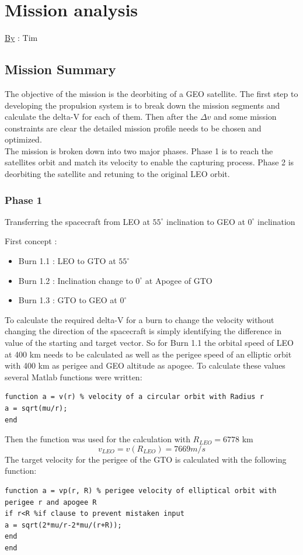 \chapter{Mission analysis}
\qquad \underline{By} : Tim
\section{Mission Summary}
The objective of the mission is the deorbiting of a GEO satellite. The first step to developing the
propulsion system is to break down the mission segments and calculate the delta-V for each of them.
Then after the $\Delta v$ and some mission constraints are clear the detailed mission profile needs to be chosen and optimized.\\

The mission is broken down into two major phases. Phase 1 is to reach the satellites orbit and match its
velocity to enable the capturing process. Phase 2 is deorbiting the satellite and retuning to the original LEO orbit.
\subsection{Phase 1}
\begin{center}
	Transferring the spacecraft from LEO at $55^\circ$ inclination to GEO at $0^\circ$ inclination
\end{center}
First concept : \\

\begin{itemize}
	\item Burn 1.1 : LEO to GTO at $55^\circ$
	\item Burn 1.2 : Inclination change to $0^\circ$ at Apogee of GTO
	\item Burn 1.3 : GTO to GEO at $0^\circ$
\end{itemize}
To calculate the required delta-V for a burn to change the velocity without changing the direction of the spacecraft is simply identifying the difference in value of the starting and target vector. So for Burn 1.1 the orbital speed of LEO at 400 km needs to be calculated as well as the perigee speed of an elliptic orbit with 400 km as perigee and GEO altitude as apogee. To calculate these values several Matlab functions were written:

\begin{verbatim}
function a = v(r) % velocity of a circular orbit with Radius r
a = sqrt(mu/r);
end
\end{verbatim}
Then the function was used for the calculation with $R_{LEO} = 6778$ km
\begin{equation}
	v_{LEO} = v(R_{LEO}) = 7669 m/s
\end{equation}
The target velocity for the perigee of the GTO is calculated with the following function:
\begin{verbatim}
function a = vp(r, R) % perigee velocity of elliptical orbit with perigee r and apogee R
if r<R %if clause to prevent mistaken input
a = sqrt(2*mu/r-2*mu/(r+R));
end
end
\end{verbatim}

